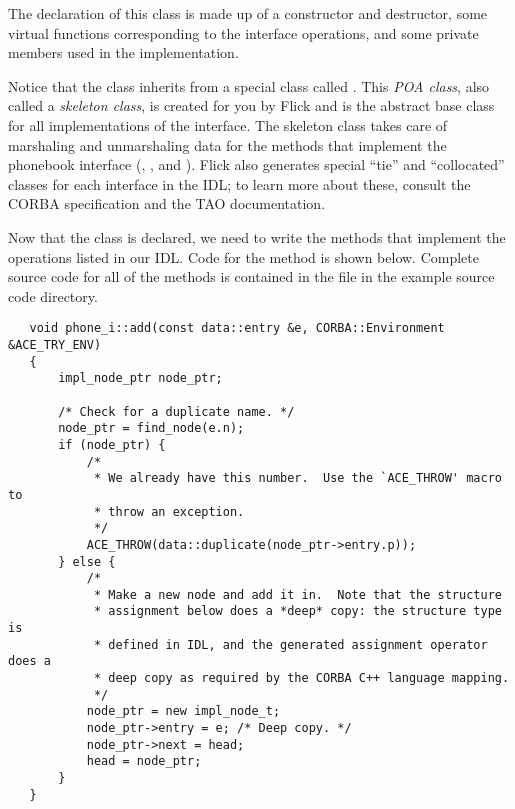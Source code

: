 The declaration of this class is made up of a constructor and destructor, some
virtual functions corresponding to the interface operations, and some private
members used in the implementation.

Notice that the  class inherits from a special class called
.  This \emph{POA class}, also called a
\emph{skeleton class}, is created for you by Flick and is the abstract base
class for all implementations of the  interface.  The
skeleton class takes care of marshaling and unmarshaling data for the methods
that implement the phonebook interface (, ,
and ).  Flick also generates special ``tie'' and ``collocated''
classes for each interface in the IDL; to learn more about these, consult the
CORBA specification and the TAO documentation.

Now that the  class is declared, we need to write the methods
that implement the operations listed in our IDL\@.  Code for the
 method is shown below.  Complete source code for all
of the  methods is contained in the  file
in the example source code directory.

\begin{verbatim}
   void phone_i::add(const data::entry &e, CORBA::Environment &ACE_TRY_ENV)
   {
       impl_node_ptr node_ptr;

       /* Check for a duplicate name. */
       node_ptr = find_node(e.n);
       if (node_ptr) {
           /*
            * We already have this number.  Use the `ACE_THROW' macro to
            * throw an exception.
            */
           ACE_THROW(data::duplicate(node_ptr->entry.p));
       } else {
           /*
            * Make a new node and add it in.  Note that the structure
            * assignment below does a *deep* copy: the structure type is
            * defined in IDL, and the generated assignment operator does a
            * deep copy as required by the CORBA C++ language mapping.
            */
           node_ptr = new impl_node_t;
           node_ptr->entry = e; /* Deep copy. */
           node_ptr->next = head;
           head = node_ptr;
       }
   }
\end{verbatim}

